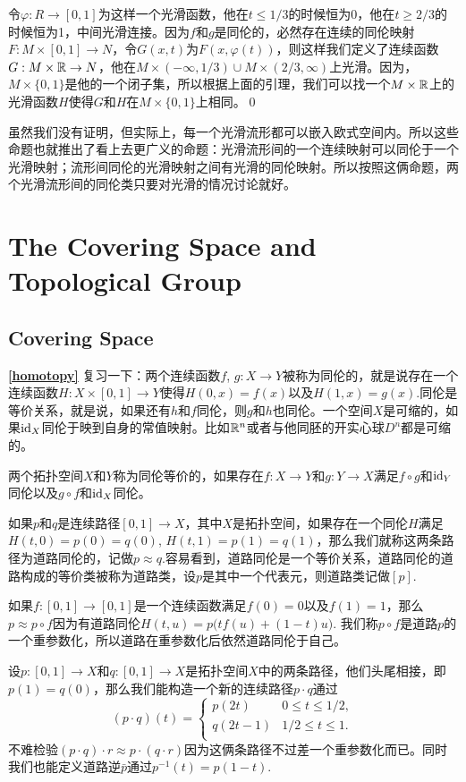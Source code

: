 \proof 令$\varphi:R\to [0,1]$为这样一个光滑函数，他在$t\leq 1/3$的时候恒为0，他在$t\geq 2/3$的时候恒为1，中间光滑连接。因为$f$和$g$是同伦的，必然存在连续的同伦映射$F:M\times [0,1]\to N$，令$G(x,t)$为$F(x,\varphi(t))$，则这样我们定义了连续函数$G:M\times \mathbb{R} \to N$，他在$M\times (-\infty,1/3)\cup M\times (2/3,\infty)$上光滑。因为，$M\times \{0,1\}$是他的一个闭子集，所以根据上面的引理，我们可以找一个$M\times \mathbb{R}$上的光滑函数$H$使得$G$和$H$在$M\times \{0,1\}$上相同。\qed

虽然我们没有证明，但实际上，每一个光滑流形都可以嵌入欧式空间内。所以这些命题也就推出了看上去更广义的命题：光滑流形间的一个连续映射可以同伦于一个光滑映射；流形间同伦的光滑映射之间有光滑的同伦映射。所以按照这俩命题，两个光滑流形间的同伦类只要对光滑的情况讨论就好。

\chapter{The Covering Space and Topological Group}

\section*{Covering Space}

\textbf{\eqref{homotopy}} 复习一下：两个连续函数$f$, $g:X\to Y$被称为{\kaishu 同伦}的，就是说存在一个连续函数$H:X\times [0,1]\to Y$使得$H(0,x)=f(x)$以及$H(1,x)=g(x)$.同伦是等价关系，就是说，如果还有$h$和$f$同伦，则$g$和$h$也同伦。一个空间$X$是可缩的，如果$\operatorname{id}_X$同伦于映到自身的常值映射。比如$\mathbb{R}^n$或者与他同胚的开实心球$D^n$都是可缩的。

两个拓扑空间$X$和$Y$称为同伦等价的，如果存在$f:X\to Y$和$g:Y\to X$满足$f\circ g$和$\operatorname{id}_Y$同伦以及$g\circ f$和$\operatorname{id}_X$同伦。

\para 如果$p$和$q$是连续路径$[0,1]\to X$，其中$X$是拓扑空间，如果存在一个同伦$H$满足$H(t,0)=p(0)=q(0)$, $H(t,1)=p(1)=q(1)$，那么我们就称这两条路径为{\kaishu 道路同伦}的，记做$p \approx q$.容易看到，道路同伦是一个等价关系，道路同伦的道路构成的等价类被称为道路类，设$p$是其中一个代表元，则道路类记做$[p]$.

如果$f:[0,1]\to[0,1]$是一个连续函数满足$f(0)=0$以及$f(1)=1$，那么$p\approx p\circ f$因为有道路同伦$H(t,u)=p\bigl(tf(u)+(1-t)u\bigr)$. 我们称$p\circ f$是道路$p$的一个重参数化，所以道路在重参数化后依然道路同伦于自己。

设$p : [0,1] \to X$和$q : [0,1] \to X$是拓扑空间$X$中的两条路径，他们头尾相接，即$p(1)=q(0)$，那么我们能构造一个新的连续路径$p\cdot q$通过
\[
	(p\cdot q)(t)=
	\begin{cases}
		p(2t) &0 \leq t\leq 1/2,\\
		q(2t-1)&1/2 \leq t\leq 1.\\
	\end{cases}
\]
不难检验$(p\cdot q)\cdot r \approx p\cdot (q\cdot r)$因为这俩条路径不过差一个重参数化而已。同时我们也能定义道路逆$\bar{p}$通过$p^{-1}(t)=p(1-t)$.

